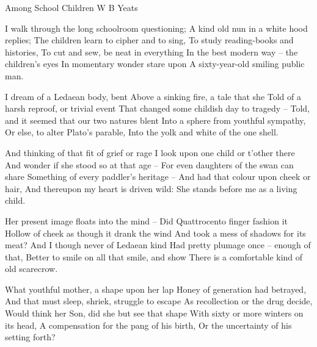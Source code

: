 \begin{poem}{Among School Children}  {W B Yeats}
  
 
 I walk through the long schoolroom questioning;
 A kind old nun in a white hood replies;
 The children learn to cipher and to sing,
 To study reading-books and histories,
 To cut and sew, be neat in everything
 In the best modern way -- the children's eyes
 In momentary wonder stare upon
 A sixty-year-old smiling public man.\\
 
 
 I dream of a Ledaean body, bent
 Above a sinking fire,  a tale that she
 Told of a harsh reproof, or trivial event
 That changed some childish day to tragedy --
 Told, and it seemed that our two natures blent
 Into a sphere from youthful sympathy,
 Or else, to alter Plato's parable,
 Into the yolk and white of the one shell.\\
 
 
 And thinking of that fit of grief or rage
 I look upon one child or t'other there
 And wonder if she stood so at that age -- 
 For even daughters of the swan can share
 Something of every paddler's heritage -- 
 And had that colour upon cheek or hair,
 And thereupon my heart is driven wild:
 She stands before me as a living child.\\
 
 
 Her present image floats into the mind -- 
 Did Quattrocento finger fashion it
 Hollow of cheek as though it drank the wind
 And took a mess of shadows for its meat?
 And I though never of Ledaean kind
 Had pretty plumage once -- enough of that,
 Better to smile on all that smile, and show
 There is a comfortable kind of old scarecrow.\\
 
 
 What youthful mother, a shape upon her lap
 Honey of generation had betrayed,
 And that must sleep, shriek, struggle to escape
 As recollection or the drug decide,
 Would think her Son, did she but see that shape
 With sixty or more winters on its head,
 A compensation for the pang of his birth,
 Or the uncertainty of his setting forth?\\
 
 

\end{poem}
